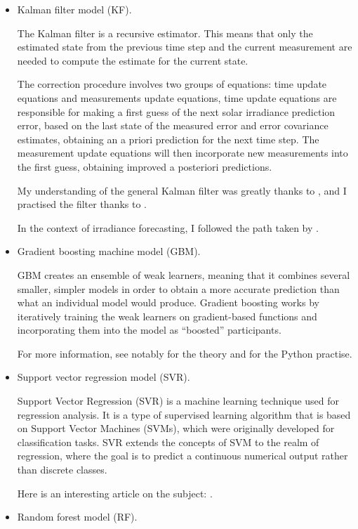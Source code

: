 \begin{itemize}
    \item Kalman filter model (KF).

The Kalman filter is a recursive estimator. This means that only the estimated state from the previous time step and the current measurement are needed to compute the estimate for the current state.

The correction procedure involves two groups of equations: time update equations
and measurements update equations, time update equations are responsible for making
a first guess of the next solar irradiance prediction error, based on the last state of the
measured error and error covariance estimates, obtaining an a priori prediction for the next
time step. The measurement update equations will then incorporate new measurements
into the first guess, obtaining improved a posteriori predictions.

My understanding of the general Kalman filter was greatly thanks to \cite{kfbasis}, and I practised the filter thanks to \cite{kfpractise}.

In the context of irradiance forecasting, I followed the path taken by \cite{suksamosorn_post-processing_2021}.
    \item Gradient boosting machine model (GBM).

GBM creates an ensemble of weak learners, meaning that it combines several smaller, simpler models in order to obtain a more accurate prediction than what an individual model would produce. Gradient boosting works by iteratively training the weak learners on gradient-based functions and incorporating them into the model as “boosted” participants. 

For more information, see notably \cite{GBMbasis} for the theory and \cite{GBMpractise} for the Python practise.
    \item Support vector regression model (SVR).

Support Vector Regression (SVR) is a machine learning technique used for regression analysis. It is a type of supervised learning algorithm that is based on Support Vector Machines (SVMs), which were originally developed for classification tasks. SVR extends the concepts of SVM to the realm of regression, where the goal is to predict a continuous numerical output rather than discrete classes.

    Here is an interesting article on the subject: \cite{SVR}.
    \item Random forest model (RF).


\end{itemize}
